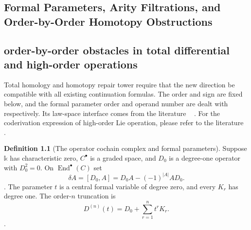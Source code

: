 \documentclass[12pt,a4paper,openany,notitlepage]{report}
\theoremstyle{plain}
\theoremstyle{definition}
\newtheorem{definition}[theorem]{Definition}
\theoremstyle{remark}
\begin{document}
\begin{CJK*}
\chapter{Formal Parameters, Arity Filtrations, and Order-by-Order Homotopy Obstructions}
\label{exp:ch:tower}


\section { order-by-order obstacles in total differential and high-order operations }\label{hgov:higher-obstruction}


Total homology and homotopy repair tower require that the new direction be compatible with all existing continuation formulas. The order and sign are fixed below, and the formal parameter order and operand number are dealt with respectively. Its law-space interface comes from the literature ~ \cite{S01,S38}. For the coderivation expression of high-order Lie operation, please refer to the literature ~ \cite{ExtLadaMarkl}.

\begin{definition} [The operator cochain complex and formal parameters]
\label{hgov:def-end}
Suppose $\mathbb k$ has characteristic zero, $C^\bullet$ is a graded space, and $D_0$ is a degree-one operator with $D_0^2=0$. On $\operatorname{End}^\bullet(C)$ set
\[
 \delta A=[D_0,A]
 =D_0A-(-1)^{|A|}AD_0.
\].
The parameter $t$ is a central formal variable of degree zero, and every $K_r$ has degree one. The order-$n$ truncation is
\[
 D^{(n)}(t)=D_0+\sum_{r=1}^nt^rK_r.
\].
\end{definition}


\end{CJK*}
\end{document}

